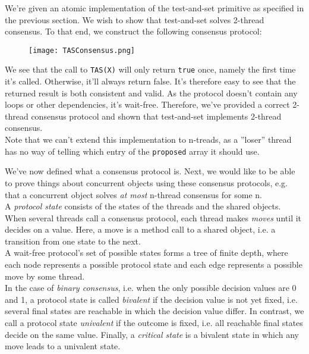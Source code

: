 \documentclass[main]{subfiles}
\begin{document}
\begin{example}
    We're given an atomic implementation of the test-and-set primitive as specified in the previous section. We wish to show that test-and-set solves 2-thread consensus. To that end, we construct the following consensus protocol:
    \begin{figure}[H]
        \centering
        \texttt{[image: TASConsensus.png]}
    \end{figure}
    We see that the call to \texttt{TAS(X)} will only return \texttt{true} once, namely the first time it's called. Otherwise, it'll always return false. It's therefore easy to see that the returned result is both consistent and valid. As the protocol doesn't contain any loops or other dependencies, it's wait-free. Therefore, we've provided a correct 2-thread consensus protocol and shown that test-and-set implements 2-thread consensus.\\[3mm]
    Note that we can't extend this implementation to n-treads, as a ''loser'' thread has no way of telling which entry of the \texttt{proposed} array it should use. 
\end{example}
We've now defined what a consensus protocol is. Next, we would like to be able to prove things about concurrent objects using these consensus protocols, e.g. that a concurrent object solves \textit{at most} n-thread consensus for some n.\\[3mm]
A \textit{protocol state} consists of the states of the threads and the shared objects. When several threads call a consensus protocol, each thread makes \textit{moves} until it decides on a value. Here, a move is a method call to a shared object, i.e. a transition from one state to the next.\\
A wait-free protocol's set of possible states forms a tree of finite depth, where each node represents a possible protocol state and each edge represents a possible move by some thread.\\
In the case of \textit{binary consensus}, i.e. when the only possible decision values are 0 and 1, a protocol state is called \textit{bivalent} if the decision value is not yet fixed, i.e. several final states are reachable in which the decision value differ. In contrast, we call a protocol state \textit{univalent} if the outcome is fixed, i.e. all reachable final states decide on the same value. Finally, a \textit{critical state} is a bivalent state in which any move leads to a univalent state.
\end{document}
